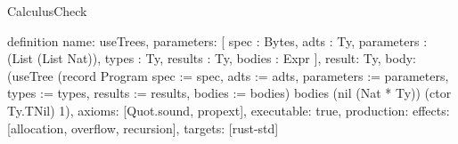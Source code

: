 \begin{lexlean}{CalculusCheck}
\begin{semanticmodule}
definition{
  name: useTrees,
  parameters: [
    spec : Bytes,
    adts : Ty,
    parameters : (List (List Nat)),
    types : Ty,
    results : Ty,
    bodies : Expr
  ],
  result: Ty,
  body: (useTree (record Program {spec := spec, adts := adts, parameters := parameters, types := types, results := results, bodies := bodies}) bodies (nil (Nat * Ty)) (ctor Ty.TNil) 1),
  axioms: [Quot.sound, propext],
  executable: true,
  production: {effects: [allocation, overflow, recursion], targets: [rust-std]}
}
\end{semanticmodule}
\end{lexlean}
